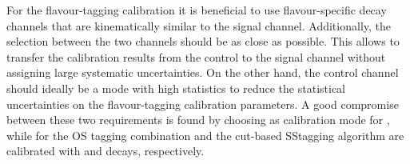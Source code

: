 For the flavour-tagging calibration it is beneficial to use flavour-specific
decay channels that are kinematically similar to the signal channel.
Additionally, the selection between the two channels should be as close as
possible. This allows to transfer the calibration results from the control to
the signal channel without assigning large systematic uncertainties. On the
other hand, the control channel should ideally be a mode with high statistics
to reduce the statistical uncertainties on the flavour-tagging calibration
parameters. A good compromise between these two requirements is found by
choosing \BdToDsD as calibration mode for \BdToDD, while for \BdToJPsiKS the
OS tagging combination and the cut-based SS\pion tagging algorithm are
calibrated with \BuToJPsiK and \BdToJPsiKstar decays, respectively.



